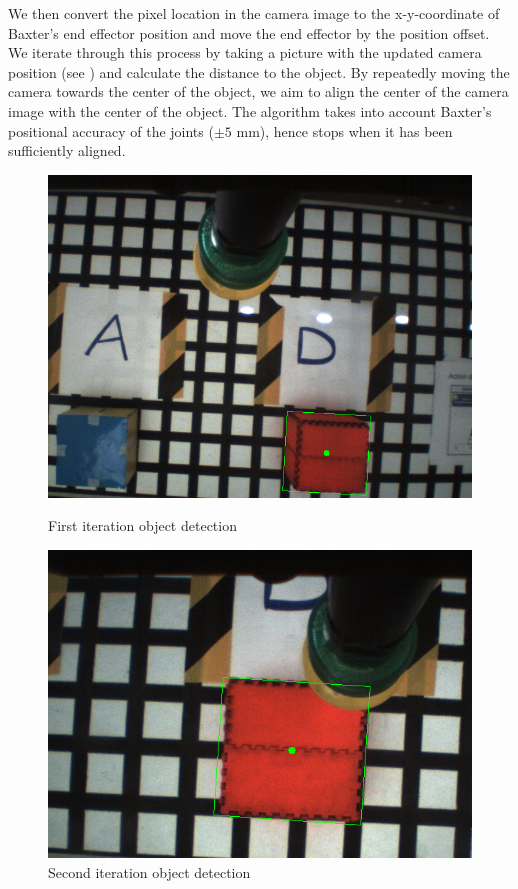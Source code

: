 We then convert the pixel location in the camera image to the x-y-coordinate of Baxter's end effector position and move the end effector by the position offset.
We iterate through this process by taking a picture with the updated camera position (see ) and calculate the distance to the object.
By repeatedly moving the camera towards the center of the object, we aim to align the center of the camera image with the center of the object.
The algorithm takes into account Baxter's positional accuracy of the joints ($\pm 5$ mm), hence stops when it has been sufficiently aligned.
\begin{figure}[h]
	\centering
	\begin{minipage}{0.5\textwidth}
		\centering
		\includegraphics[scale=0.35]{figures/detectObject1}
		\caption{First iteration object detection}
		\label{fig:detectObject1}
	\end{minipage}%
	\begin{minipage}{.5\textwidth}
		\centering
		\includegraphics[scale=0.45]{figures/detectObject2}
		\caption{Second iteration object detection}
		\label{fig:detectObject2}
	\end{minipage}
\end{figure}

